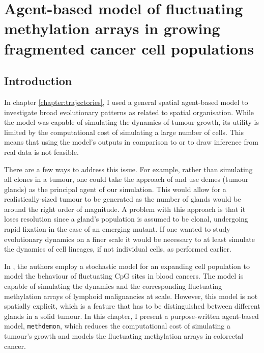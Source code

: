 \chapter{Agent-based model of fluctuating methylation arrays in growing
fragmented cancer cell populations}
\label{chapter:methdemon}


\section{Introduction}
In chapter \ref{chapter:trajectories}, I used a general spatial agent-based
model to investigate broad evolutionary patterns as related to spatial
organisation. While the model was capable of simulating the dynamics of tumour
growth, its utility is limited by the computational cost of simulating a large
number of cells. This means that using the model's outputs in comparison to or
to draw inference from real data is not feasible. \par
There are a few ways to address this issue. For example, rather than simulating
all clones in a tumour, one could take the approach of
\cite{sottoriva_big_2015} and use demes (tumour glands) as the principal agent
of our simulation. This would allow for a realistically-sized tumour to be
generated as the number of glands would be around the right order of magnitude.
A problem with this approach is that it loses resolution since a gland's
population is assumed to be clonal, undergoing rapid fixation in the case of an
emerging mutant. If one wanted to study evolutionary dynamics on a finer scale
it would be necessary to at least simulate the dynamics of cell lineages, if
not individual cells, as performed earlier. \par
In \cite{gabbutt_evolutionary_2023}, the authors employ a stochastic model for
an expanding cell population to model the behaviour of fluctuating CpG sites in
blood cancers. The model is capable of simulating the dynamics and the
corresponding fluctuating methylation arrays of lymphoid malignancies at scale.
However, this model is not spatially explicit, which is a feature that has to
be distinguished between different glands in a solid tumour. In this chapter, I
present a purpose-written agent-based model, \texttt{methdemon}, which reduces
the computational cost of simulating a tumour's growth and models the
fluctuating methylation arrays in colorectal cancer.

